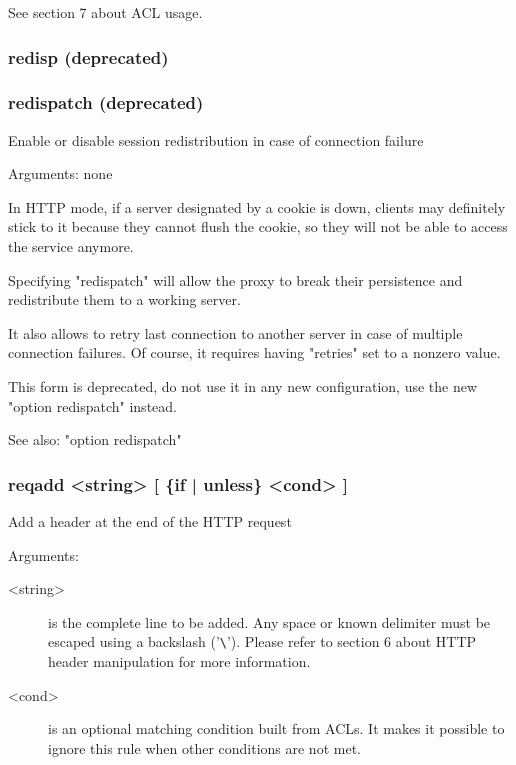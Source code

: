   See section 7 about ACL usage.

\subsubsection[redisp]{redisp (deprecated)}
\subsubsection[redispatch]{redispatch (deprecated)}


  Enable or disable session redistribution in case of connection failure


  Arguments: none

  In HTTP mode, if a server designated by a cookie is down, clients may
  definitely stick to it because they cannot flush the cookie, so they will not
  be able to access the service anymore.

  Specifying "redispatch" will allow the proxy to break their persistence and
  redistribute them to a working server.

  It also allows to retry last connection to another server in case of multiple
  connection failures. Of course, it requires having "retries" set to a nonzero
  value.

  This form is deprecated, do not use it in any new configuration, use the new
  "option redispatch" instead.

  See also: "option redispatch"

\subsubsection[reqadd]{reqadd  <string> [ \{if | unless\} <cond> ]}


  Add a header at the end of the HTTP request


  Arguments:
  
\begin{description}
\item[<string>] is the complete line to be added. Any space or known delimiter
              must be escaped using a backslash ('\verb|\|'). Please refer to section
              6 about HTTP header manipulation for more information.

\item[<cond>] is an optional matching condition built from ACLs. It makes it
              possible to ignore this rule when other conditions are not met.
\end{description}

